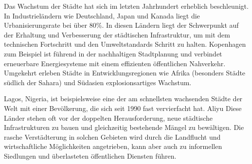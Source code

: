\documentclass[conference,compsoc,final,a4paper, onecolumn, 11pt]{IEEEtran}
\begin{document}
Das Wachstum der Städte hat sich im letzten Jahrhundert erheblich beschleunigt. 
In Industrieländern wie Deutschland, Japan und Kanada liegt die Urbanisierungsrate bei über 80\%. 
In diesen Ländern liegt der Schwerpunkt auf der Erhaltung und Verbesserung der städtischen Infrastruktur, um mit dem technischen Fortschritt und den Umweltstandards Schritt zu halten. \autocite[S. 6ff]{Taubenbock2015-pj}
Kopenhagen zum Beispiel ist führend in der nachhaltigen Stadtplanung und verbindet erneuerbare Energiesysteme mit einem effizienten öffentlichen Nahverkehr. 
Umgekehrt erleben Städte in Entwicklungsregionen wie Afrika (besonders Städte südlich der Sahara) und Südasien explosionsartiges Wachstum. 

Lagos, Nigeria, ist beispielsweise eine der am schnellsten wachsenden Städte der Welt mit einer Bevölkerung, die sich seit 1990 fast vervierfacht hat. 
Aliyu Diese Länder stehen oft vor der doppelten Herausforderung, neue städtische Infrastrukturen zu bauen und gleichzeitig bestehende Mängel zu bewältigen. 
Die rasche Verstädterung in solchen Gebieten wird durch die Landflucht und wirtschaftliche Möglichkeiten angetrieben, kann aber auch zu informellen Siedlungen und überlasteten öffentlichen Diensten führen.
\end{document}
